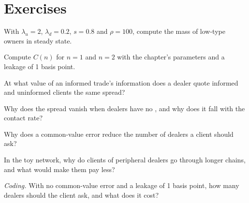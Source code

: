 \section{Exercises}

\begin{exercise}[$\star$]\label{exo:mx:request-for-quote-and-dealer-markets-in-theory:1}
With $\lambda_u=2$, $\lambda_d=0.2$, $s=0.8$ and $\rho=100$, compute the mass of low-type owners in steady state.
\end{exercise}

\begin{exercise}[$\star$]\label{exo:mx:request-for-quote-and-dealer-markets-in-theory:2}
Compute $C(n)$ for $n=1$ and $n=2$ with the chapter's parameters and a leakage of 1 basis point.
\end{exercise}

\begin{exercise}[$\star$]\label{exo:mx:request-for-quote-and-dealer-markets-in-theory:3}
At what value of an informed trade's information does a dealer quote informed and uninformed clients the same spread?
\end{exercise}

\begin{exercise}[$\star\star$]\label{exo:mx:request-for-quote-and-dealer-markets-in-theory:4}
Why does the spread vanish when dealers have no , and why does it fall with the contact rate?
\end{exercise}

\begin{exercise}[$\star\star$]\label{exo:mx:request-for-quote-and-dealer-markets-in-theory:5}
Why does a common-value error reduce the number of dealers a client should ask?
\end{exercise}

\begin{exercise}[$\star\star$]\label{exo:mx:request-for-quote-and-dealer-markets-in-theory:6}
In the toy network, why do clients of peripheral dealers go through longer chains, and what would make them pay less?
\end{exercise}

\begin{exercise}[$\star\star\star$]\label{exo:mx:request-for-quote-and-dealer-markets-in-theory:7}
\emph{Coding.} With no common-value error and a leakage of 1 basis point, how many dealers should the client ask, and what does it cost?
\end{exercise}


